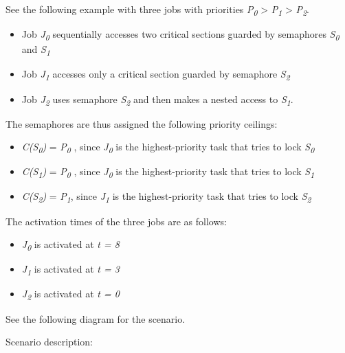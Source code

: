 See the following example with three jobs with priorities
\emph{P\textsubscript{0}} \textgreater{} \emph{P\textsubscript{1}}
\textgreater{} \emph{P\textsubscript{2}}.

\begin{itemize}
\item
  Job \emph{J\textsubscript{0}} sequentially accesses two critical
  sections guarded by semaphores \emph{S\textsubscript{0}} and
  \emph{S\textsubscript{1}}
\item
  Job \emph{J\textsubscript{1}} accesses only a critical section guarded
  by semaphore \emph{S\textsubscript{2}}
\item
  Job \emph{J\textsubscript{2}} uses semaphore \emph{S\textsubscript{2}}
  and then makes a nested access to \emph{S\textsubscript{1}}.
\end{itemize}

The semaphores are thus assigned the following priority ceilings:

\begin{itemize}
\item
  \emph{C(S\textsubscript{0})} = \emph{P\textsubscript{0 }}, since
  \emph{J\textsubscript{0}} is the highest-priority task that tries to
  lock \emph{S\textsubscript{0}}
\item
  \emph{C(S\textsubscript{1})} = \emph{P\textsubscript{0 }}, since
  \emph{J\textsubscript{0}} is the highest-priority task that tries to
  lock \emph{S\textsubscript{1}}
\item
  \emph{C(S\textsubscript{2})} = \emph{P\textsubscript{1}}, since
  \emph{J\textsubscript{1}} is the highest-priority task that tries to
  lock \emph{S\textsubscript{2}}
\end{itemize}

The activation times of the three jobs are as follows:

\begin{itemize}
\item
  \emph{J\textsubscript{0}} is activated at \emph{t = 8}
\item
  \emph{J\textsubscript{1}} is activated at \emph{t = 3}
\item
  \emph{J\textsubscript{2}} is activated at \emph{t = 0}
\end{itemize}

See the following diagram for the scenario.

Scenario description:

